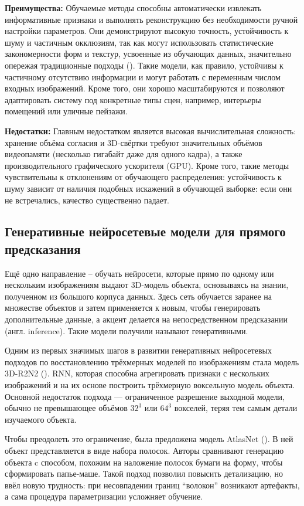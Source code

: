 \textbf{Преимущества:}
Обучаемые методы способны автоматически извлекать информативные признаки и
выполнять реконструкцию без необходимости ручной настройки параметров. Они
демонстрируют высокую точность, устойчивость к шуму и частичным окклюзиям, так
как могут использовать статистические закономерности форм и текстур, усвоенные
из обучающих данных, значительно опережая традиционные подходы
(\cite{10.1109/CVPR.2017.272}). Такие модели, как правило, устойчивы к
частичному отсутствию информации и могут работать с переменным числом входных
изображений. Кроме того, они хорошо масштабируются и позволяют адаптировать
систему под конкретные типы сцен, например, интерьеры помещений или уличные
пейзажи.

\textbf{Недостатки:}
Главным недостатком является высокая вычислительная сложность: хранение объёма
согласия и 3D-свёртки требуют значительных объёмов видеопамяти (несколько
гигабайт даже для одного кадра), а также производительного графического
ускорителя (GPU). Кроме того, такие методы чувствительны к отклонениям от
обучающего распределения: устойчивость к шуму зависит от наличия подобных
искажений в обучающей выборке: если они не встречались, качество существенно
падает.

\subsection{Генеративные нейросетевые модели для прямого предсказания}

Ещё одно направление – обучать нейросети, которые прямо по одному или нескольким
изображениям выдают 3D-модель объекта, основываясь на знании, полученном из
большого корпуса данных. Здесь сеть обучается заранее на множестве объектов и
затем применяется к новым, чтобы генерировать дополнительные данные, а акцент
делается на непосредственном предсказании (англ. inference). Такие модели
получили называют генеративными.

Одним из первых значимых шагов в развитии генеративных нейросетевых подходов по
восстановлению трёхмерных моделей по изображениям стала модель 3D-R2N2
(\cite{choy20163dr2n2unifiedapproachsingle}). RNN, которая способна агрегировать
признаки с нескольких изображений и на их основе построить трёхмерную воксельную
модель объекта. Основной недостаток подхода — ограниченное
разрешение выходной модели, обычно не превышающее объёмов \(32^3\) или \(64^3\)
вокселей, теряя тем самым детали изучаемого объекта.

Чтобы преодолеть это ограничение, была предложена модель AtlasNet
(\cite{groueix2018atlasnetpapiermacheapproachlearning}). В ней объект
представляется в виде набора полосок. Авторы сравнивают генерацию объекта c
способом, похожим на наложение полосок бумаги на форму, чтобы сформировать
папье-маше. Такой подход позволил повысить детализацию, но ввёл новую
трудность: при несовпадении границ ``волокон'' возникают артефакты, а сама процедура
параметризации усложняет обучение.


